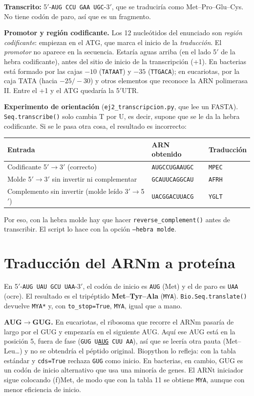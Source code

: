 \documentclass[11pt,a4paper]{article}
\newcommand{\sq}[1]{\texttt{#1}}
\begin{document}
\textbf{Transcrito:} 5$'$-\sq{AUG CCU GAA UGC}-3$'$, que se traduciría como Met--Pro--Glu--Cys. No tiene codón de paro, así que es un fragmento.

\textbf{Promotor y región codificante.} Los 12 nucleótidos del enunciado son \emph{región codificante}: empiezan en el ATG, que marca el inicio de la \emph{traducción}. El \emph{promotor} no aparece en la secuencia. Estaría aguas arriba (en el lado 5$'$ de la hebra codificante), antes del sitio de inicio de la transcripción (+1). En bacterias está formado por las cajas $-10$ (\sq{TATAAT}) y $-35$ (\sq{TTGACA}); en eucariotas, por la caja TATA (hacia $-25/-30$) y otros elementos que reconoce la ARN polimerasa II. Entre el +1 y el ATG quedaría la 5$'$UTR.

\textbf{Experimento de orientación} (\sq{ej2\_transcripcion.py}, que lee un FASTA). \sq{Seq.transcribe()} solo cambia T por U, es decir, supone que se le da la hebra codificante. Si se le pasa otra cosa, el resultado es incorrecto:
\begin{center}\small
\begin{tabular}{lll}
\toprule
Entrada & ARN obtenido & Traducción \\
\midrule
Codificante 5$'\!\to$3$'$ (correcto) & \sq{AUGCCUGAAUGC} & \sq{MPEC}\\
Molde 5$'\!\to$3$'$ sin invertir ni complementar & \sq{GCAUUCAGGCAU} & \sq{AFRH}\\
Complemento sin invertir (molde leído 3$'\!\to$5$'$) & \sq{UACGGACUUACG} & \sq{YGLT}\\
\bottomrule
\end{tabular}
\end{center}
Por eso, con la hebra molde hay que hacer \sq{reverse\_complement()} antes de transcribir. El script lo hace con la opción \sq{--hebra molde}.

\section{Traducción del ARNm a proteína}
En 5$'$-\sq{AUG UAU GCU UAA}-3$'$, el codón de inicio es \sq{AUG} (Met) y el de paro es \sq{UAA} (ocre). El resultado es el tripéptido \textbf{Met--Tyr--Ala} (\sq{MYA}). \sq{Bio.Seq.translate()} devuelve \sq{MYA*} y, con \sq{to\_stop=True}, \sq{MYA}, igual que a mano.

\textbf{AUG$\to$GUG.} En eucariotas, el ribosoma que recorre el ARNm pasaría de largo por el GUG y empezaría en el siguiente AUG. Aquí ese AUG está en la posición 5, fuera de fase (\sq{GUG U\underline{AUG} CUU AA}), así que se leería otra pauta (Met--Leu\dots) y no se obtendría el péptido original. Biopython lo refleja: con la tabla estándar y \sq{cds=True} rechaza \sq{GUG} como inicio. En bacterias, en cambio, GUG es un codón de inicio alternativo que usa una minoría de genes. El ARNt iniciador sigue colocando (f)Met, de modo que con la tabla 11 se obtiene \sq{MYA}, aunque con menor eficiencia de inicio.
\end{document}
